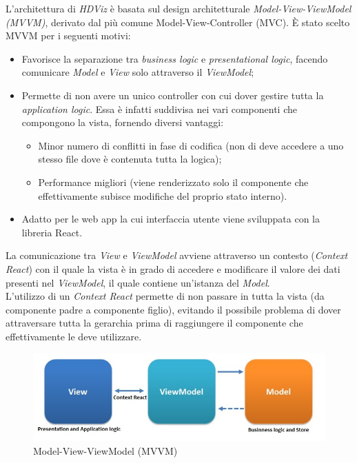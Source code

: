 L'architettura di \textit{HDViz} è basata sul design architetturale \textit{Model-View-ViewModel (MVVM)}, derivato dal più comune Model-View-Controller (MVC). 
È stato scelto MVVM per i seguenti motivi: 
\begin{itemize}
	\item Favorisce la separazione tra \textit{business logic} e \textit{presentational logic}, facendo comunicare \textit{Model} e \textit{View} solo attraverso il \textit{ViewModel};  
	\item Permette di non avere un unico controller con cui dover gestire tutta la \textit{application logic}. Essa è infatti suddivisa nei vari componenti che compongono la vista, fornendo diversi vantaggi: 
	\begin{itemize}
		\item Minor numero di conflitti in fase di codifica (non di deve accedere a uno stesso file dove è contenuta tutta la logica);
		\item Performance migliori (viene renderizzato solo il componente che effettivamente subisce modifiche del proprio stato interno).
	\end{itemize}
	\item Adatto per le web app la cui interfaccia utente viene sviluppata con la libreria React.
\end{itemize}

La comunicazione tra \textit{View} e \textit{ViewModel} avviene attraverso un contesto (\textit{Context React}) con il quale la vista è in grado di accedere e modificare il valore dei dati presenti nel \textit{ViewModel}, il quale contiene un'istanza del \textit{Model}. \\
L'utilizzo di un \textit{Context React} permette di non passare  in tutta la vista (da componente padre a componente figlio), evitando il possibile problema di dover attraversare tutta la gerarchia prima di raggiungere il componente che effettivamente le deve utilizzare.

\begin{figure}[hb]
\includegraphics[width=15.8cm]{Extra/MVVMPattern}
\centering
\caption{Model-View-ViewModel (MVVM)}
\end{figure}